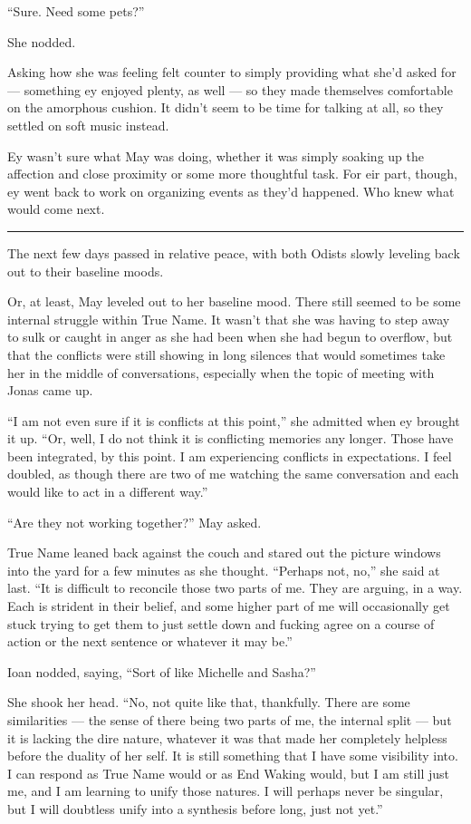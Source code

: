 ``Sure. Need some pets?''

She nodded.

Asking how she was feeling felt counter to simply providing what she'd asked for — something ey enjoyed plenty, as well — so they made themselves comfortable on the amorphous cushion. It didn't seem to be time for talking at all, so they settled on soft music instead.

Ey wasn't sure what May was doing, whether it was simply soaking up the affection and close proximity or some more thoughtful task. For eir part, though, ey went back to work on organizing events as they'd happened. Who knew what would come next.

\begin{center}\rule{0.5\linewidth}{0.5pt}\end{center}

The next few days passed in relative peace, with both Odists slowly leveling back out to their baseline moods.

Or, at least, May leveled out to her baseline mood. There still seemed to be some internal struggle within True Name. It wasn't that she was having to step away to sulk or caught in anger as she had been when she had begun to overflow, but that the conflicts were still showing in long silences that would sometimes take her in the middle of conversations, especially when the topic of meeting with Jonas came up.

``I am not even sure if it is conflicts at this point,'' she admitted when ey brought it up. ``Or, well, I do not think it is conflicting memories any longer. Those have been integrated, by this point. I am experiencing conflicts in expectations. I feel doubled, as though there are two of me watching the same conversation and each would like to act in a different way.''

``Are they not working together?'' May asked.

True Name leaned back against the couch and stared out the picture windows into the yard for a few minutes as she thought. ``Perhaps not, no,'' she said at last. ``It is difficult to reconcile those two parts of me. They are arguing, in a way. Each is strident in their belief, and some higher part of me will occasionally get stuck trying to get them to just settle down and fucking agree on a course of action or the next sentence or whatever it may be.''

Ioan nodded, saying, ``Sort of like Michelle and Sasha?''

She shook her head. ``No, not quite like that, thankfully. There are some similarities — the sense of there being two parts of me, the internal split — but it is lacking the dire nature, whatever it was that made her completely helpless before the duality of her self. It is still something that I have some visibility into. I can respond as True Name would or as End Waking would, but I am still just me, and I am learning to unify those natures. I will perhaps never be singular, but I will doubtless unify into a synthesis before long, just not yet.''

